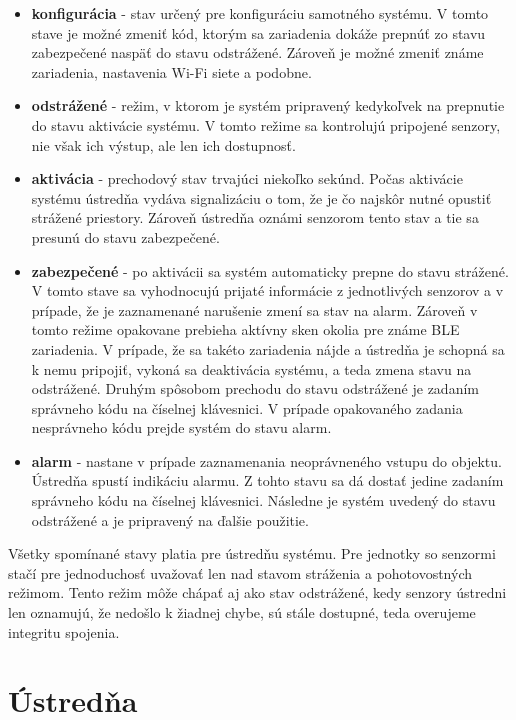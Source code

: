 \begin{itemize}
    \item \textbf{konfigurácia} - stav určený pre konfiguráciu samotného systému. V tomto stave je možné zmeniť kód, ktorým sa zariadenia dokáže prepnúť zo stavu zabezpečené naspäť do stavu odstrážené. Zároveň je možné zmeniť známe zariadenia, nastavenia Wi-Fi siete a podobne. 
    \item \textbf{odstrážené} - režim, v ktorom je systém pripravený kedykoľvek na prepnutie do stavu aktivácie systému. V tomto režime sa kontrolujú pripojené senzory, nie však ich výstup, ale len ich dostupnosť.
    \item \textbf{aktivácia} - prechodový stav trvajúci niekoľko sekúnd. Počas aktivácie systému ústredňa vydáva signalizáciu o tom, že je čo najskôr nutné opustiť strážené priestory. Zároveň ústredňa oznámi senzorom tento stav a tie sa presunú do stavu zabezpečené.
    \item \textbf{zabezpečené} - po aktivácii sa systém automaticky prepne do stavu strážené. V tomto stave sa vyhodnocujú prijaté informácie z jednotlivých senzorov a v prípade, že je zaznamenané narušenie zmení sa stav na alarm. Zároveň v tomto režime opakovane prebieha aktívny sken okolia pre známe BLE zariadenia. V prípade, že sa takéto zariadenia nájde a ústredňa je schopná sa k nemu pripojiť, vykoná sa deaktivácia systému, a teda zmena stavu na odstrážené. Druhým spôsobom prechodu do stavu odstrážené je zadaním správneho kódu na číselnej klávesnici. V prípade opakovaného zadania nesprávneho kódu prejde systém do stavu alarm.
    \item \textbf{alarm} - nastane v prípade zaznamenania neoprávneného vstupu do objektu. Ústredňa spustí indikáciu alarmu. Z tohto stavu sa dá dostať jedine zadaním správneho kódu na číselnej klávesnici. Následne je systém uvedený do stavu odstrážené a je pripravený na ďalšie použitie.
\end{itemize}

Všetky spomínané stavy platia pre ústredňu systému. Pre jednotky so senzormi stačí pre jednoduchosť uvažovať len nad stavom stráženia a pohotovostných režimom. Tento režim môže chápať aj ako stav odstrážené, kedy senzory ústredni len oznamujú, že nedošlo k žiadnej chybe, sú stále dostupné, teda overujeme integritu spojenia.

\section{Ústredňa}

